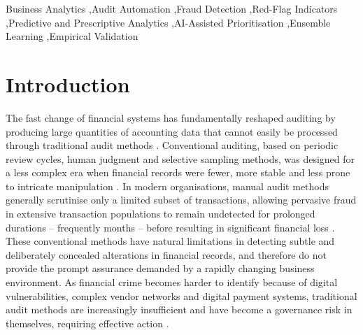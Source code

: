 \documentclass[preprint,12pt]{elsarticle}
\begin{document}
\begin{frontmatter}
\begin{abstract}
algorithmic bias and insufficient transparency -- and offers a strategic framework for auditors, organisations and regulators to improve digital audit capability. Limitations of both the review (secondary sources, publication and language bias) and the empirical validation (a single public benchmark rather than primary audit-log data, anonymised features, a single train/test split) are reported explicitly, and external validation on primary audit data is identified as a priority for future research. All feature-engineering and model code used to produce the empirical results is released for reproducibility.
\end{abstract}

\begin{keyword}
Business Analytics \sep Audit Automation \sep Fraud Detection \sep Red-Flag Indicators \sep Predictive and Prescriptive Analytics \sep AI-Assisted Prioritisation \sep Ensemble Learning \sep Empirical Validation
\end{keyword}

\end{frontmatter}

\section{Introduction}
\label{sec:intro}

The fast change of financial systems has fundamentally reshaped auditing by producing large quantities of accounting data that cannot easily be processed through traditional audit methods \citep{ebirim2024}. Conventional auditing, based on periodic review cycles, human judgment and selective sampling methods, was designed for a less complex era when financial records were fewer, more stable and less prone to intricate manipulation \citep{darwin2024}. In modern organisations, manual audit methods generally scrutinise only a limited subset of transactions, allowing pervasive fraud in extensive transaction populations to remain undetected for prolonged durations -- frequently months -- before resulting in significant financial loss \citep{rumasukun2024}. These conventional methods have natural limitations in detecting subtle and deliberately concealed alterations in financial records, and therefore do not provide the prompt assurance demanded by a rapidly changing business environment. As financial crime becomes harder to identify because of digital vulnerabilities, complex vendor networks and digital payment systems, traditional audit methods are increasingly insufficient and have become a governance risk in themselves, requiring effective action \citep{johnsonrokosu2025,elumilade2024}.
\end{document}
